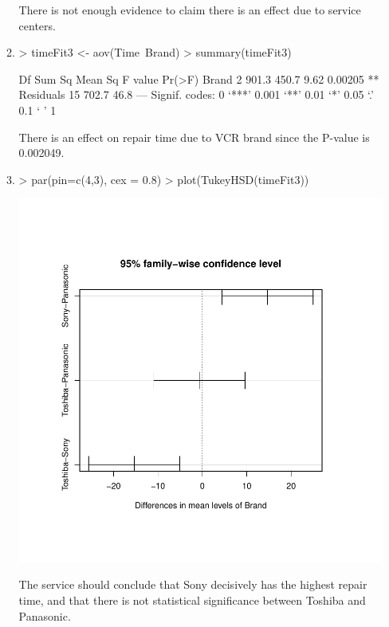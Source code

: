 \documentclass{article}
\begin{document}
\begin{enumerate}
\begin{enumerate}
There is not enough evidence to claim there is an effect due to service centers.

\item

\begin{Schunk}
\begin{Sinput}
> timeFit3 <- aov(Time~Brand)
> summary(timeFit3)
\end{Sinput}
\begin{Soutput}
            Df Sum Sq Mean Sq F value  Pr(>F)   
Brand        2  901.3   450.7    9.62 0.00205 **
Residuals   15  702.7    46.8                   
---
Signif. codes:  0 ‘***’ 0.001 ‘**’ 0.01 ‘*’ 0.05 ‘.’ 0.1 ‘ ’ 1
\end{Soutput}
\end{Schunk}

There is an effect on repair time due to VCR brand since the P-value is 0.002049.

\item

\begin{Schunk}
\begin{Sinput}
> par(pin=c(4,3), cex = 0.8)
> plot(TukeyHSD(timeFit3))
\end{Sinput}
\end{Schunk}
\includegraphics{Homework6-007}

The service should conclude that Sony decisively has the highest repair time, and that there is not statistical significance between Toshiba and Panasonic. 

\end{enumerate}

\end{enumerate}
\end{document}
